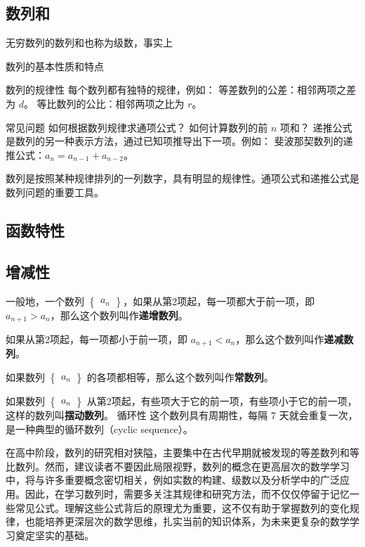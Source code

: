 \subsection{数列和}

无穷数列的数列和也称为级数，事实上


数列的基本性质和特点

数列的规律性
每个数列都有独特的规律，例如：
等差数列的公差：相邻两项之差为 $d$。
等比数列的公比：相邻两项之比为 $r$。

常见问题
如何根据数列规律求通项公式？
如何计算数列的前 $n$ 项和？
递推公式是数列的另一种表示方法，通过已知项推导出下一项。例如：
斐波那契数列的递推公式：$a_n = a_{n-1} + a_{n-2}$。

数列是按照某种规律排列的一列数字，具有明显的规律性。通项公式和递推公式是数列问题的重要工具。
\subsection{函数特性}

\subsection{增减性}
一般地，一个数列 $\begin{Bmatrix} a_n \end{Bmatrix}$，如果从第2项起，每一项都大于前一项，即 $a_{n+1}>a_n$，那么这个数列叫作\textbf{递增数列}。

如果从第2项起，每一项都小于前一项，即 $a_{n+1}<a_n$，那么这个数列叫作\textbf{递减数列}。

如果数列 $\begin{Bmatrix} a_n \end{Bmatrix}$ 的各项都相等，那么这个数列叫作\textbf{常数列}。

如果数列 $\begin{Bmatrix} a_n \end{Bmatrix}$ 从第2项起，有些项大于它的前一项，有些项小于它的前一项，这样的数列叫\textbf{摆动数列}。
循环性
这个数列具有周期性，每隔 7 天就会重复一次，是一种典型的循环数列（cyclic sequence）。

在高中阶段，数列的研究相对狭隘，主要集中在古代早期就被发现的等差数列和等比数列。然而，建议读者不要因此局限视野，数列的概念在更高层次的数学学习中，将与许多重要概念密切相关，例如实数的构建、级数以及分析学中的广泛应用。因此，在学习数列时，需要多关注其规律和研究方法，而不仅仅停留于记忆一些常见公式。理解这些公式背后的原理尤为重要，这不仅有助于掌握数列的变化规律，也能培养更深层次的数学思维，扎实当前的知识体系，为未来更复杂的数学学习奠定坚实的基础。
